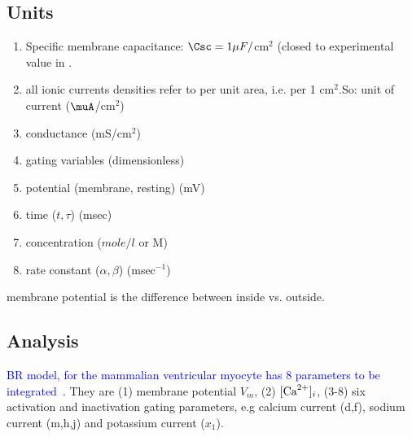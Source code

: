 \subsection{Units}
\label{sec:units-1}

\begin{enumerate}
\item Specific membrane capacitance: $\Csc = 1\mu F/$cm$^2$ (closed to
  experimental value in \citep{weidmann1970ect}.
\item all ionic currents densities refer to per unit area, i.e. per 1 cm$^2$.So:
unit of current ($\muA$/cm$^2$)

\item conductance (mS/cm$^2$)
\item gating variables (dimensionless)
\item potential (membrane, resting) (mV)
\item time ($t,\tau$) (msec)
\item concentration ($mole/l$ or M) 
\item rate constant ($\alpha, \beta$) (msec$^{-1}$)
\end{enumerate}
membrane potential is the difference between inside vs. outside. 


\subsection{Analysis}
\label{sec:analysis-8}

\textcolor{blue}{BR model, for the mammalian ventricular myocyte has 8
  parameters to be integrated}~\citep{reuter1973dcc, beeler1977rap}.
They are (1) membrane potential $V_m$, (2) $[{\text{Ca}^{2+}} ]_{i}$, (3-8)
six activation and inactivation gating parameters, e.g calcium current
(d,f), sodium current (m,h,j) and potassium current ($x_1$).

